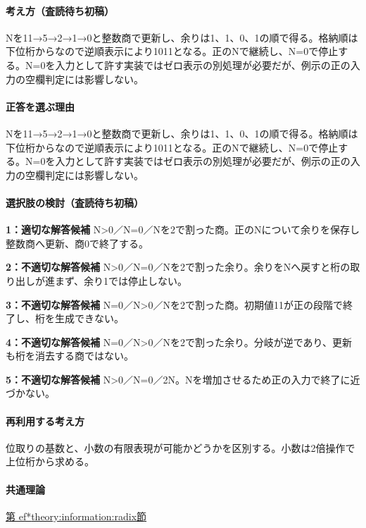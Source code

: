 \paragraph{考え方（査読待ち初稿）} Nを11→5→2→1→0と整数商で更新し、余りは1、1、0、1の順で得る。格納順は下位桁からなので逆順表示により1011となる。正のNで継続し、N=0で停止する。N=0を入力として許す実装ではゼロ表示の別処理が必要だが、例示の正の入力の空欄判定には影響しない。

\paragraph{正答を選ぶ理由} Nを11→5→2→1→0と整数商で更新し、余りは1、1、0、1の順で得る。格納順は下位桁からなので逆順表示により1011となる。正のNで継続し、N=0で停止する。N=0を入力として許す実装ではゼロ表示の別処理が必要だが、例示の正の入力の空欄判定には影響しない。

\paragraph{選択肢の検討（査読待ち初稿）}

\noindent\textbf{1：適切な解答候補} N>0／N=0／Nを2で割った商。正のNについて余りを保存し整数商へ更新、商0で終了する。\par

\noindent\textbf{2：不適切な解答候補} N>0／N=0／Nを2で割った余り。余りをNへ戻すと桁の取り出しが進まず、余り1では停止しない。\par

\noindent\textbf{3：不適切な解答候補} N=0／N>0／Nを2で割った商。初期値11が正の段階で終了し、桁を生成できない。\par

\noindent\textbf{4：不適切な解答候補} N=0／N>0／Nを2で割った余り。分岐が逆であり、更新も桁を消去する商ではない。\par

\noindent\textbf{5：不適切な解答候補} N>0／N=0／2N。Nを増加させるため正の入力で終了に近づかない。\par

\paragraph{再利用する考え方} 位取りの基数と、小数の有限表現が可能かどうかを区別する。小数は2倍操作で上位桁から求める。

\paragraph{共通理論} \hyperref[theory:information:radix]{第
ef*{theory:information:radix}節}

